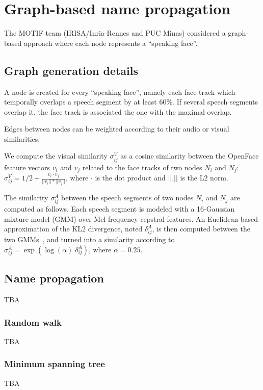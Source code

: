 \section{Graph-based name propagation}
\label{sec:graph}

The MOTIF team (IRISA/Inria-Rennes and PUC Minas) considered a graph-based approach where each node represents a ``speaking face''.

\subsection{Graph generation details}
\label{ssec:graph_gen}

A node is created for every ``speaking face'', namely each face track which temporally overlaps a speech segment by at least 60\%. If several speech segments overlap it, the face track is associated the one with the maximal overlap.

Edges between nodes can be weighted according to their audio or visual similarities. 

We compute the visual similarity $\sigma^V_{ij}$ as a cosine similarity between the OpenFace feature vectors $v_i$ and $v_j$ related to the face tracks of two nodes $N_i$ and $N_j$: $\sigma^V_{ij}=1/2+\frac{v_i\cdot v_j}{||v_i||*||v_j||}$, where $\cdot$ is the dot product and $||.||$ is the L2 norm.

The similarity $\sigma^A_{ij}$ between the speech segments of two nodes  $N_i$ and $N_j$ are computed as follows. Each speech segment is modeled with a 16-Gaussian mixture model (GMM) over Mel-frequency cepstral features. An Euclidean-based approximation of the KL2 divergence, noted $\delta^A_{ij}$, is then computed between the two GMMs~\cite{Ben}, and turned into a
similarity according to $\sigma^A_{ij}=\exp(\log{(\alpha)} \; \delta^A_{ij})$, where $\alpha = 0.25$.

\subsection{Name propagation}

TBA

\subsubsection{Random walk}

TBA

\subsubsection{Minimum spanning tree}

TBA

\endinput
